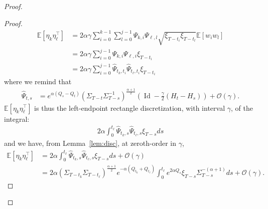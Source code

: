 \documentclass[11pt]{article}
\newcommand{\id}{\operatorname{Id}}
\newcommand{\EE}{\mathbb{E}}
\begin{document}
\begin{proof}
\begin{proof}
\begin{align*}
     \EE[\eta_k \eta_{\ell}^\top]  &=  2\alpha \gamma \sum_{i=0}^{k-1} \sum_{l=0}^{j-1} \Psi_{k,i} \Psi_{\ell,l}  \sqrt{ \xi_{T - t_i} \xi_{T - t_l}} \EE[w_i w_l] \\
     &= 2\alpha \gamma \sum_{i=0}^{j-1}  \Psi_{k,i} \Psi_{\ell,i} \xi_{T - t_i} \\
    &= 2\alpha \gamma \sum_{i=0}^{j-1}  \hat \Psi_{t_k,t_i} \hat\Psi_{t_\ell,t_i} \xi_{T - t_i}
\end{align*}
where we remind that
\begin{align*}
\hat \Psi_{t,s} &= e^{\alpha (Q_{s} - Q_{t})} \left( \Sigma_{T-t} \Sigma_{T-s}^{-1} \right)^{\frac{\alpha+1}{2}} \left(\id - \frac{\gamma}{2}(H_t - H_s)\right) + \mathcal{O}(\gamma) .
\end{align*}
$ \EE[\eta_k \eta_{\ell}^\top]$ is thus the left-endpoint rectangle discretization, with interval $\gamma$, of the integral:
\begin{align*}
2 \alpha \int_0^{t_\ell} \hat \Psi_{t_k,s} \hat \Psi_{t_\ell,s} \xi_{T - s}ds
\end{align*}
and we have, from Lemma~\ref{lem:disc}, at zeroth-order in $\gamma$,
\begin{align}
\EE[\eta_k \eta_{\ell}^\top] &= 2\alpha  \int_0^{t_\ell} \hat \Psi_{t_k,s} \hat \Psi_{t_\ell,s} \xi_{T - s}ds + \mathcal{O}(\gamma)\\
&= 2\alpha \left( \Sigma_{T-t_k} \Sigma_{T-t_\ell} \right)^{\frac{\alpha+1}{2}} e^{- \alpha( Q_{t_k} + Q_{t_\ell})}\int_0^{t_\ell} e^{2 \alpha Q_{s}}  \xi_{T - s} \Sigma_{T-s}^{-(\alpha + 1)} ds + \mathcal{O}(\gamma) \label{eq:493}.
\end{align}

\end{proof}
\end{proof}
\end{document}
